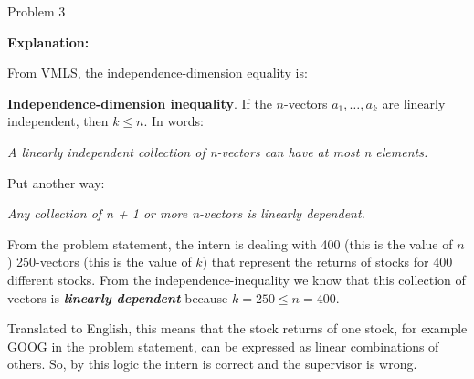\begin{problem}{Problem 3}
\begin{Highlight}[Solution]
        \textbf{Explanation:} \vspace*{1em}

        From VMLS, the independence-dimension equality is:


        \textbf{Independence-dimension inequality}. If the $n$-vectors $a_{1}, \dots , a_{k}$ are linearly independent, then $k \leq n$. In words:
        
        \begin{center}
            \textit{A linearly independent collection of n-vectors can have at most n elements.}
        \end{center}

        Put another way:
        
        \begin{center}
            \textit{Any collection of n + 1 or more n-vectors is linearly dependent.}
        \end{center}


        From the problem statement, the intern is dealing with 400 (this is the value of $n$) 250-vectors (this is the value of $k$) that represent the returns of stocks for 400 different stocks. From the independence-inequality
        we know that this collection of vectors is \textit{\textbf{linearly dependent}} because $k = 250 \leq n = 400$.

        Translated to English, this means that the stock returns of one stock, for example GOOG in the problem statement, can be expressed as linear combinations of others. So, by this logic the intern is correct and the
        supervisor is wrong.
    \end{Highlight}
\end{problem}

